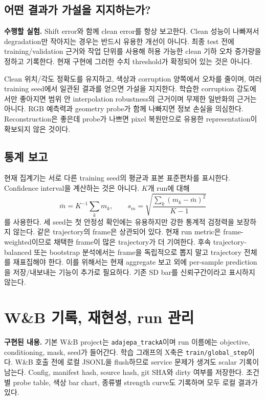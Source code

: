 \documentclass[11pt,a4paper]{article}
\newcommand{\code}[1]{\nolinkurl{#1}}
\newcommand{\impl}{\textbf{구현된 내용.} }
\newcommand{\plan}{\textbf{수행할 실험.} }
\begin{document}
\subsection{어떤 결과가 가설을 지지하는가?}
\plan Shift error와 함께 clean error를 항상 보고한다. Clean 성능이 나빠져서
degradation만 작아지는 경우는 반드시 유용한 개선이 아니다.
최종 test 전에 training/validation 근거와 작업 단위를 사용해 허용 가능한 clean
기하 오차 증가량을 정하고 기록한다. 현재 구현에 그러한 수치 threshold가
확정되어 있는 것은 아니다.

Clean 위치/각도 정확도를 유지하고, 색상과 corruption 양쪽에서 오차를 줄이며,
여러 training seed에서 일관된 결과를 얻으면 가설을 지지한다.
학습한 corruption 강도에서만 좋아지면 범위 안 interpolation robustness의
근거이며 무제한 일반화의 근거는 아니다. RGB 예측력과 geometry probe가 함께
나빠지면 정보 손실을 의심한다. Reconstruction은 좋은데 probe가 나쁘면
pixel 복원만으로 유용한 representation이 확보되지 않은 것이다.

\subsection{통계 보고}
현재 집계기는 서로 다른 training seed의 평균과 표본 표준편차를 표시한다.
Confidence interval을 계산하는 것은 아니다. $K$개 run에 대해
\begin{equation}
\bar m=K^{-1}\sum_km_k,\qquad
s_m=\sqrt{\frac{\sum_k(m_k-\bar m)^2}{K-1}}
\end{equation}
를 사용한다. 세 seed는 첫 안정성 확인에는 유용하지만 강한 통계적 검정력을
보장하지 않는다. 같은 trajectory의 frame은 상관되어 있다. 현재 run metric은
frame-weighted이므로 채택한 frame이 많은 trajectory가 더 기여한다.
후속 trajectory-balanced 또는 bootstrap 분석에서는 frame을 독립적으로
뽑지 말고 trajectory 전체를 재표집해야 한다. 이를 위해서는 현재 aggregate
보고 외에 per-sample prediction을 저장/내보내는 기능이 추가로 필요하다.
기존 SD bar를 신뢰구간이라고 표시하지 않는다.

\section{W\&B 기록, 재현성, run 관리}
\impl 기본 W\&B project는 \code{adajepa_trackA}이며 run 이름에는 objective,
conditioning, mask, seed가 들어간다. 학습 그래프의 X축은
\code{train/global_step}이다. W\&B 호출 전에 로컬 JSONL을 flush하므로 service
문제가 생겨도 scalar 기록이 남는다. Config, manifest hash, source hash,
git SHA와 dirty 여부를 저장한다. 조건별 probe table, 색상 bar chart, 종류별
strength curve도 기록하며 모두 로컬 결과가 있다.
\end{document}
